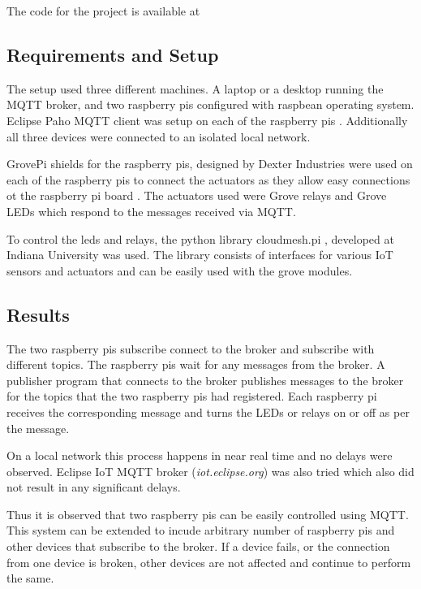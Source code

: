 The code for the project is available at 


\subsection{Requirements and Setup}

The setup used three different machines. A laptop or a desktop running
the MQTT broker, and two raspberry pis configured with raspbean
operating system. Eclipse Paho MQTT client was setup on each of the
raspberry pis \cite{python-paho-mqtt}. Additionally all three devices
were connected to an isolated local network.

GrovePi shields for the raspberry pis, designed by Dexter Industries
were used on each of the raspberry pis to connect the actuators as
they allow easy connections ot the raspberry pi board \cite{grovepi}.
The actuators used were Grove relays \cite{grove-relay} and Grove LEDs
\cite{grove-led} which respond to the messages received via MQTT.

To control the leds and relays, the python library cloudmesh.pi
\cite{cloudmesh.pi}, developed at Indiana University was used. The
library consists of interfaces for various IoT sensors and actuators
and can be easily used with the grove modules.



\subsection{Results}

The two raspberry pis subscribe connect to the broker and subscribe
with different topics. The raspberry pis wait for any messages from
the broker. A publisher program that connects to the broker publishes
messages to the broker for the topics that the two raspberry pis had
registered. Each raspberry pi receives the corresponding message and
turns the LEDs or relays on or off as per the message.

On a local network this process happens in near real time and no
delays were observed. Eclipse IoT MQTT broker (\textit{iot.eclipse.org})
was also tried which also did not result in any significant delays.

Thus it is observed that two raspberry pis can be easily controlled
using MQTT. This system can be extended to incude arbitrary number of
raspberry pis and other devices that subscribe to the broker. If a
device fails, or the connection from one device is broken, other
devices are not affected and continue to perform the same.

